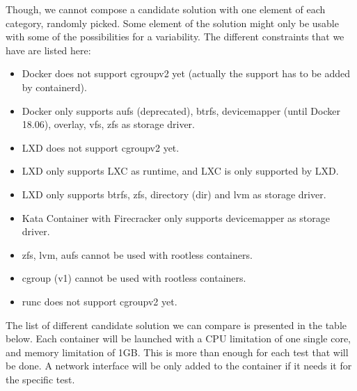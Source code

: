Though, we cannot compose a candidate solution with one element of each category, randomly picked.  Some element of the solution might only be usable with some of the possibilities for a variability.  The different constraints that we have are listed here:
\begin{itemize}
  \renewcommand\labelitemi{--}
  \item Docker does not support cgroupv2 yet (actually the support has to be added by containerd).
  \item Docker only supports aufs (deprecated), btrfs, devicemapper (until Docker 18.06), overlay, vfs, zfs as storage driver.
  \item LXD does not support cgroupv2 yet.
  \item LXD only supports LXC as runtime, and LXC is only supported by LXD.
  \item LXD only supports btrfs, zfs, directory (dir) and lvm as storage driver.
  \item Kata Container with Firecracker only supports devicemapper as storage driver.
  \item zfs, lvm, aufs cannot be used with rootless containers.
  \item cgroup (v1) cannot be used with rootless containers.
  \item runc does not support cgroupv2 yet.
\end{itemize}

The list of different candidate solution we can compare is presented in the table below.  Each container will be launched with a CPU limitation of one single core, and memory limitation of 1GB.  This is more than enough for each test that will be done.  A network interface will be only added to the container if it needs it for the specific test.\\\\

